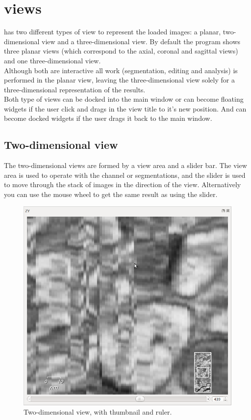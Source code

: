 \section{\espina{} views}

\espina{} has two different types of view to represent the loaded images: a planar, 
two-dimensional view and a three-dimensional view. By default the program shows three
planar views (which correspond to the axial, coronal and sagittal views) and one
three-dimensional view. \\
Although both are interactive all work (segmentation, editing and analysis) is
performed in the planar view, leaving the three-dimensional view solely for
a three-dimensional representation of the results. \\
Both type of views can be docked into the main \espina{} window or can become floating
widgets if the user click and drags in the view title to it's new position. And can become
docked widgets if the user drags it back to the \espina{} main window. \\

\subsection{Two-dimensional view}

The two-dimensional views are formed by a view area and a slider bar. The view area is
used to operate with the channel or segmentations, and the slider is used to move through
the stack of images in the direction of the view. Alternatively you can use the mouse wheel
to get the same result as using the slider.\\

\begin{figure}[H]
\centering
\includegraphics[scale=0.33]{fig/2DView}
\caption{Two-dimensional view, with thumbnail and ruler.}
\end{figure}

